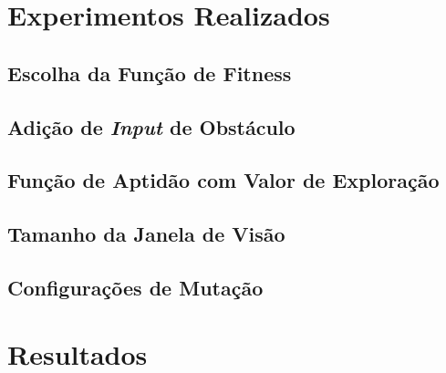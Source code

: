 \section{\label{section:experiments}Experimentos Realizados}

\subsection{Escolha da Função de Fitness}

\subsection{Adição de \textit{Input} de Obstáculo}

\subsection{Função de Aptidão com Valor de Exploração}

\subsection{Tamanho da Janela de Visão}

\subsection{Configurações de Mutação}

\section{\label{section:results}Resultados}

